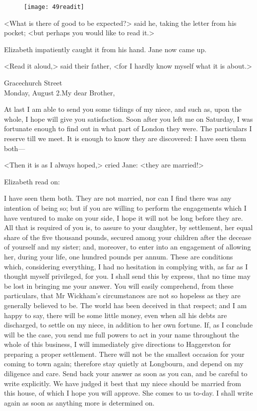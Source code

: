 \begin{figure}[tbh]
\centering
\texttt{[image: 49readit]}
\end{figure}

<What is there of good to be expected?> said he, taking the letter from his pocket; <but perhaps you would like to read it.>

Elizabeth impatiently caught it from his hand. Jane now came up.

<Read it aloud,> said their father, <for I hardly know myself what it is about.>

\begin{mail}{Gracechurch Street\\ Monday, August 2.}{My dear Brother,}

At last I am able to send you some tidings of my niece, and such as, upon the whole, I hope will give you satisfaction. Soon after you left me on Saturday, I was fortunate enough to find out in what part of London they were. The particulars I reserve till we meet. It is enough to know they are discovered: I have seen them both—

\pausemail

<Then it is as I always hoped,> cried Jane: <they are married!>

Elizabeth read on: 

\resumemail

I have seen them both. They are not married, nor can I find there was any intention of being so; but if you are willing to perform the engagements which I have ventured to make on your side, I hope it will not be long before they are. All that is required of you is, to assure to your daughter, by settlement, her equal share of the five thousand pounds, secured among your children after the decease of yourself and my sister; and, moreover, to enter into an engagement of allowing her, during your life, one hundred pounds per annum. These are conditions which, considering everything, I had no hesitation in complying with, as far as I thought myself privileged, for you. I shall send this by express, that no time may be lost in bringing me your answer. You will easily comprehend, from these particulars, that Mr Wickham's circumstances are not so hopeless as they are generally believed to be. The world has been deceived in that respect; and I am happy to say, there will be some little money, even when all his debts are discharged, to settle on my niece, in addition to her own fortune. If, as I conclude will be the case, you send me full powers to act in your name throughout the whole of this business, I will immediately give directions to Haggerston for preparing a proper settlement. There will not be the smallest occasion for your coming to town again; therefore stay quietly at Longbourn, and depend on my diligence and care. Send back your answer as soon as you can, and be careful to write explicitly. We have judged it best that my niece should be married from this house, of which I hope you will approve. She comes to us to-day. I shall write again as soon as anything more is determined on. 

\end{mail}

